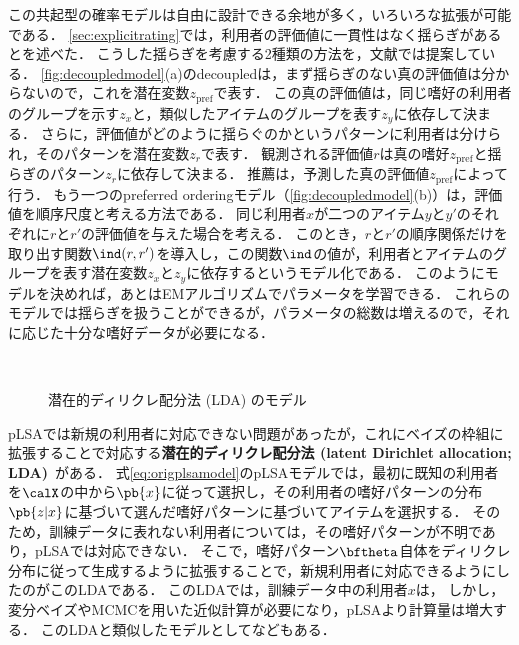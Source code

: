 この共起型の確率モデルは自由に設計できる余地が多く，いろいろな拡張が可能である．
\ref{sec:explicitrating}では，利用者の評価値に一貫性はなく揺らぎがあるとを述べた．
こうした揺らぎを考慮する2種類の方法を，文献\cite{uai:03:01}では提案している．
\ref{fig:decoupledmodel}(a)のdecoupledは，まず揺らぎのない真の評価値は分からないので，これを潜在変数$z_\mathrm{pref}$で表す．
この真の評価値は，同じ嗜好の利用者のグループを示す$z_x$と，類似したアイテムのグループを表す$z_y$に依存して決まる．
さらに，評価値がどのように揺らぐのかというパターンに利用者は分けられ，そのパターンを潜在変数$z_r$で表す．
観測される評価値$r$は真の嗜好$z_\mathrm{pref}$と揺らぎのパターン$z_r$に依存して決まる．
推薦は，予測した真の評価値$z_\mathrm{pref}$によって行う．
もう一つのpreferred orderingモデル（\ref{fig:decoupledmodel}(b)）は，評価値を順序尺度と考える方法である．
同じ利用者$x$が二つのアイテム$y$と$y'$のそれぞれに$r$と$r'$の評価値を与えた場合を考える．
このとき，$r$と$r'$の順序関係だけを取り出す関数$\ind(r,r')$を導入し，この関数$\ind$の値が，利用者とアイテムのグループを表す潜在変数$z_x$と$z_y$に依存するというモデル化である．
このようにモデルを決めれば，あとはEMアルゴリズムでパラメータを学習できる．
これらのモデルでは揺らぎを扱うことができるが，パラメータの総数は増えるので，それに応じた十分な嗜好データが必要になる．

\begin{figure}
\centering
{}\\
\caption{潜在的ディリクレ配分法 (LDA) のモデル\cite{jmlr:03:05}}
\label{fig:lda}
\end{figure}

pLSAでは新規の利用者に対応できない問題があったが，これにベイズの枠組に拡張することで対応する\textbf{潜在的ディリクレ配分法 (latent Dirichlet allocation; LDA)}~\cite{jmlr:03:05}がある．
式\eqref{eq:origplsamodel}のpLSAモデルでは，最初に既知の利用者を$\calX$の中から$\pb{x}$に従って選択し，その利用者の嗜好パターンの分布$\pb{z|x}$に基づいて選んだ嗜好パターンに基づいてアイテムを選択する．
そのため，訓練データに表れない利用者については，その嗜好パターンが不明であり，pLSAでは対応できない．
そこで，嗜好パターン$\bftheta$自体をディリクレ分布に従って生成するように拡張することで，新規利用者に対応できるようにしたのがこのLDAである．
このLDAでは，訓練データ中の利用者$x$は，
しかし，変分ベイズやMCMCを用いた近似計算が必要になり，pLSAより計算量は増大する．
このLDAと類似したモデルとして\cite{icml:04:07}などもある．


